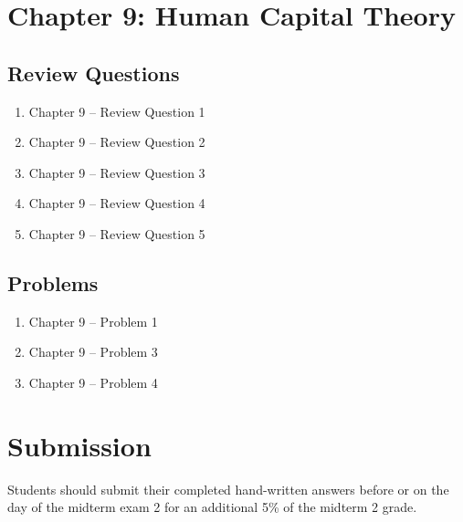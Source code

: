 \documentclass[12pt]{article}
\begin{document}
\section*{Chapter 9: Human Capital Theory}

\subsection*{Review Questions}

\begin{enumerate}
\item Chapter 9 -- Review Question 1
\item Chapter 9 -- Review Question 2
\item Chapter 9 -- Review Question 3
\item Chapter 9 -- Review Question 4
\item Chapter 9 -- Review Question 5
\end{enumerate}

\subsection*{Problems}

\begin{enumerate}
\item Chapter 9 -- Problem 1
\item Chapter 9 -- Problem 3
\item Chapter 9 -- Problem 4
\end{enumerate}

\vspace{1cm}

\section*{Submission}

Students should submit their completed hand-written answers before or on the day of the midterm exam 2 for an additional 5\% of the midterm 2 grade.
\end{document}
